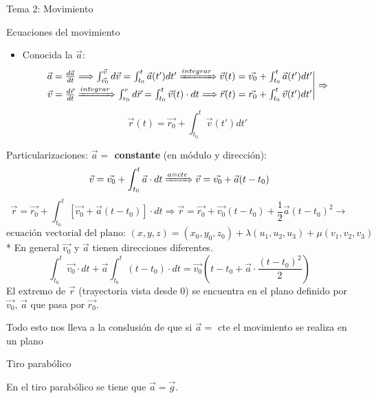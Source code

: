 \documentclass[10pt, letterpaper]{article}
\newcommand{\negrita}[1]{\textbf{#1}}
\newcommand{\integral}[2]{\int_{#1}^{#2}}
\begin{document}
\begin{section}{Tema 2: Movimiento}
\begin{subsection}{Ecuaciones del movimiento}
\begin{itemize}
            \item Conocida la $\vec{a}$:
                \[\begin{matrix}
                \vec{a} = \frac{d\vec{a}}{dt} \Longrightarrow \integral{\vec{v_0}}{\vec{v}} d\vec{v} = \integral{t_0}{t}\vec{a}(t')dt' \xRightarrow{integrar} \vec{v}(t) = \vec{v_0} + \integral{t_0}{t}\vec{a}(t')dt'\\
                \vec{v} = \frac{d\vec{r}}{dt} \xRightarrow{integrar} \integral{r_0}{r}d\vec{r} = \integral{t_0}{t}\vec{v}(t)\cdot dt \Longrightarrow\vec{r}(t) = \vec{r_0} + \integral{t_0}{t}\vec{v}(t')dt'
                \end{matrix}
                \Bigg\vert \Rightarrow\]
                \[\vec{r}(t)= \vec{r_0} + \integral{t_0}{t}\vec{v}(t')dt'\]

        \end{itemize}
    \end{subsection}

    \begin{subsection}{Particularizaciones:}
            \negrita{$\vec{a} = $ constante} (en módulo y dirección):
            \[\vec{v} = \vec{v_0} + \integral{t_0}{t}\vec{a}\cdot dt \xRightarrow[]{a=cte}\vec{v} = \vec{v_0} + \vec{a}(t-t_0)\]
            \[\vec{r}=\vec{r_0}   + \integral{t_0}{t}[\vec{v_0}+\vec{a}(t-t_0)]\cdot dt \Rightarrow \vec{r} = \vec{r_0} + \vec{v_0}(t-t_0) + \frac{1}{2}\vec{a}(t-t_0)^2 \longrightarrow\]
            \[\text{ecuación vectorial del plano: } (x, y, z) = (x_0, y_0, z_0) + \lambda(u_1, u_2, u_3) + \mu (v_1, v_2, v_3)\] 
            * En general $\vec{v_0}$ y $\vec{a}$ tienen direcciones diferentes.
            \[\integral{t_0}{t}\vec{v_0}\cdot dt + \vec{a}\integral{t_0}{t}(t-t_0  ) \cdot dt = \vec{v_0}(t-t_0  + \vec{a}\cdot \frac{(t-t_0)^2}{2})\]
            El extremo de $\vec{r}$ (trayectoria vista desde 0) se encuentra en el plano definido por $\vec{v_0}$, $\vec{a}$ que pasa por $\vec{r_0}$.

            Todo esto nos lleva a la conslusión de que si $\vec{a} = $ cte el movimiento se realiza en un plano
    \end{subsection}

    \begin{subsection}{Tiro parabólico}

        En el tiro parabólico se tiene que $\vec{a} = \vec{g}$.
    \end{subsection}

\end{section}
\end{document}
